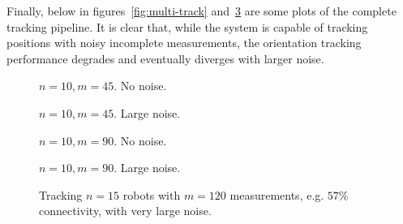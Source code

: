 Finally, below in figures~\ref{fig:multi-track} and~\ref{fig:single-track} are some plots of the complete tracking pipeline. It is clear that, while the system is capable of tracking positions with noisy incomplete measurements, the orientation tracking performance degrades and eventually diverges with larger noise. 
\begin{figure*}
    \begin{subfigure}{0.49\linewidth}
        
        \caption{$n=10, m=45$. No noise.}
        \label{fig:track-partial-noiseless}
    \end{subfigure}
    \hfill
    \begin{subfigure}{0.49\linewidth}
        
        \caption{$n=10, m=45$. Large noise.}
        \label{fig:track-partial-noisy}
    \end{subfigure}
    \begin{subfigure}{0.49\linewidth}
        
        \caption{$n=10, m=90$. No noise.}
    \end{subfigure}
    \hfill
    \begin{subfigure}{0.49\linewidth}
        
        \caption{$n=10, m=90$. Large noise.}
    \end{subfigure}
    \caption{Sample tracking performance for $n=10$ robots with varying numbers of measurements and noise. Dashed line is ground truth, red line is estimated state.}
    \label{fig:multi-track}
\end{figure*}
\FloatBarrier
\begin{figure}[ht]
    \centering
    
    \caption{Tracking $n=15$ robots with $m=120$ measurements, e.g. $57\%$ connectivity, with very large noise.}
    \label{fig:single-track}
\end{figure}